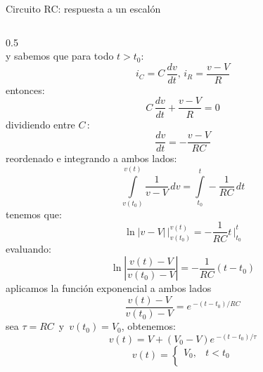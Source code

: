\documentclass[aspectratio=169]{beamer}
\begin{document}
\begin{frame}{Circuito RC: respuesta a un escalón}
\begin{columns}[onlytextwidth]
\begin{column}{0.5\textwidth}
{{\begin{equation*}
            \end{equation*}
            }
            {y sabemos que para todo $t>t_0$: 
            \begin{equation*}
                i_C = C\,\dfrac{dv}{dt},\, i_R=\dfrac{v-V}{R}
            \end{equation*}
            }
            {entonces:
            \begin{equation*}
                C\,\dfrac{dv}{dt} + \dfrac{v-V}{R} = 0
            \end{equation*}
            }
        }
            {
            {dividiendo entre $C\,$:
            \begin{equation*}
                \dfrac{dv}{dt} = -\dfrac{v-V}{RC}
            \end{equation*}
            }
            {reordenado e integrando a ambos lados:
            \begin{equation*}
                \int\limits_{v(t_0)}^{v(t)}\dfrac{1}{v-V}\,dv = \int\limits_{t_0}^{t}-\frac{1}{RC}\,dt
            \end{equation*}
            }
        }
            {
            {tenemos que:
            \begin{equation*}
                \ln|v-V|\,\bigg|_{v(t_0)}^{v(t)} = -\frac{1}{RC}t\,\bigg|_{t_0}^{t}
            \end{equation*}
            }
            {evaluando:
            \begin{equation*}
                \ln\left|\dfrac{v(t)-V}{v(t_0)-V}\right| = -\frac{1}{RC}(t - t_0)
            \end{equation*}
            }
        }
            {
            {aplicamos la función exponencial a ambos lados
            \begin{equation*}
                \dfrac{v(t)-V}{v(t_0)-V} = e\,^{-(t - t_0)/RC}
            \end{equation*}
            }
            {sea $\tau=RC\,$ y $\,v(t_0) = V_0$, obtenemos:
            \begin{equation*}
                v(t)=V + (V_0-V)e\,^{-(t - t_0)/ \tau}
            \end{equation*}
            }
        }
            {
            {\begin{equation*}
                v(t) =
                \begin{cases}
                    V_0, & t < t_0\\

\end{cases}
\end{equation*}}}
\end{column}
\end{columns}
\end{frame}
\end{document}
